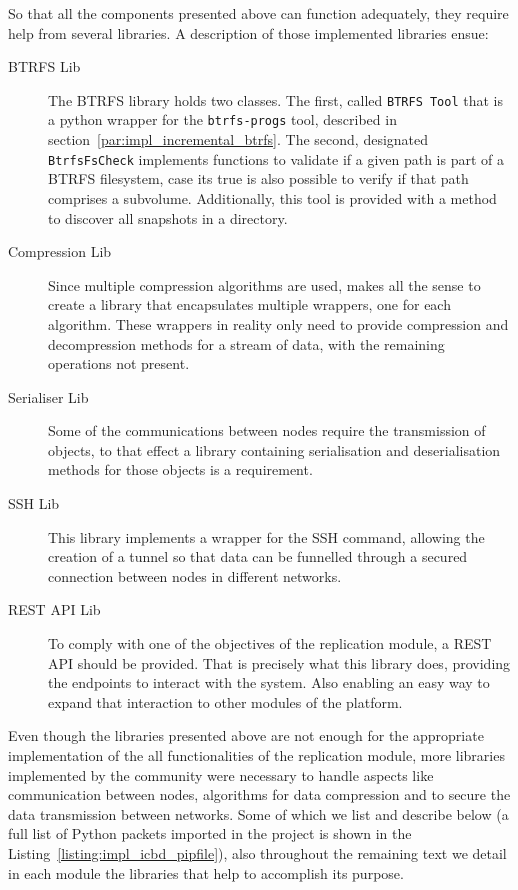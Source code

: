 So that all the components presented above can function adequately, they require help from several libraries. A description of those implemented libraries ensue:

\begin{description}
	\item [BTRFS Lib] The BTRFS library holds two classes. The first, called \texttt{BTRFS Tool} that is a python wrapper for the \texttt{btrfs-progs} tool, described in section~\ref{par:impl_incremental_btrfs}. The second, designated \texttt{BtrfsFsCheck} implements functions to validate if a given path is part of a BTRFS filesystem, case its true is also possible to verify if that path comprises a subvolume. Additionally, this tool is provided with a method to discover all snapshots in a directory.
	\item [Compression Lib] Since multiple compression algorithms are used, makes all the sense to create a library that encapsulates multiple wrappers, one for each algorithm. These wrappers in reality only need to provide compression and decompression methods for a stream of data, with the remaining operations not present.
	\item [Serialiser Lib] Some of the communications between nodes require the transmission of objects, to that effect a library containing serialisation and deserialisation methods for those objects is a requirement.
	\item [SSH Lib] This library implements a wrapper for the SSH command, allowing the creation of a tunnel so that data can be funnelled through a secured connection between nodes in different networks.
	\item [REST API Lib] To comply with one of the objectives of the replication module, a REST API should be provided. That is precisely what this library does, providing the endpoints to interact with the system. Also enabling an easy way to expand that interaction to other modules of the platform.

\end{description}

Even though the libraries presented above are not enough for the appropriate implementation of the all functionalities of the replication module, more libraries implemented by the community were necessary to handle aspects like communication between nodes, algorithms for data compression and to secure the data transmission between networks. Some of which we list and describe below  (a full list of Python packets imported in the project is shown in the Listing~\ref{listing:impl_icbd_pipfile}), also throughout the remaining text we detail in each module the libraries that help to accomplish its purpose.

